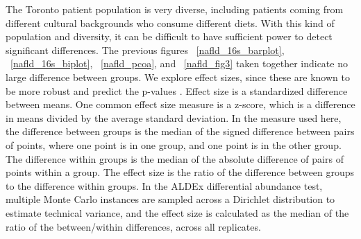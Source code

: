 The Toronto patient population is very diverse, including patients coming from different cultural backgrounds who consume different diets. With this kind of population and diversity, it can be difficult to have sufficient power to detect significant differences. The previous figures ~\ref{nafld_16s_barplot}, ~\ref{nafld_16s_biplot}, ~\ref{nafld_pcoa}, and ~\ref{nafld_fig3} taken together indicate no large difference between groups. We explore effect sizes, since these are known to be more robust and predict the p-values \cite{halsey2015fickle}. Effect size is a standardized difference between means. One common effect size measure is a z-score, which is a difference in means divided by the average standard deviation. In the measure used here, the difference between groups is the median of the signed difference between pairs of points, where one point is in one group, and one point is in the other group. The difference within groups is the median of the absolute difference of pairs of points within a group. The effect size is the ratio of the difference between groups to the difference within groups. In the ALDEx differential abundance test, multiple Monte Carlo instances are sampled across a Dirichlet distribution to estimate technical variance, and the effect size is calculated as the median of the ratio of the between/within differences, across all replicates.

